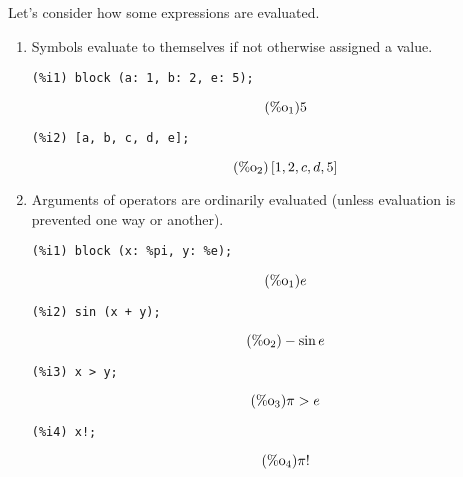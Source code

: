 \documentclass[12pt,leqno]{article}
\begin{document}
Let's consider how some expressions are evaluated.

\begin{enumerate}

\item Symbols evaluate to themselves if not otherwise assigned a value.
\begin{verbatim}
(%i1) block (a: 1, b: 2, e: 5);
\end{verbatim}
\begin{equation}
\tag{$\mathop{\mathrm{\%o}}_{1}$}5
\label{eq:doc-group1-code12-1-1}
\end{equation}
\begin{verbatim}
(%i2) [a, b, c, d, e];
\end{verbatim}
\begin{equation}
\tag{$\mathop{\mathrm{\%o}}_{2}$}\left[1, 2, c, d, 5\right]
\label{eq:doc-group1-code12-2-1}
\end{equation}


\item Arguments of operators are ordinarily evaluated (unless evaluation is prevented one way or another).
\begin{verbatim}
(%i1) block (x: %pi, y: %e);
\end{verbatim}
\begin{equation}
\tag{$\mathop{\mathrm{\%o}}_{1}$}e
\label{eq:doc-group1-code13-1-1}
\end{equation}
\begin{verbatim}
(%i2) sin (x + y);
\end{verbatim}
\begin{equation}
\tag{$\mathop{\mathrm{\%o}}_{2}$}-\sin e
\label{eq:doc-group1-code13-2-1}
\end{equation}
\begin{verbatim}
(%i3) x > y;
\end{verbatim}
\begin{equation}
\tag{$\mathop{\mathrm{\%o}}_{3}$}\pi > e
\label{eq:doc-group1-code13-3-1}
\end{equation}
\begin{verbatim}
(%i4) x!;
\end{verbatim}
\begin{equation}
\tag{$\mathop{\mathrm{\%o}}_{4}$}\pi!
\label{eq:doc-group1-code13-4-1}
\end{equation}



\end{enumerate}
\end{document}
